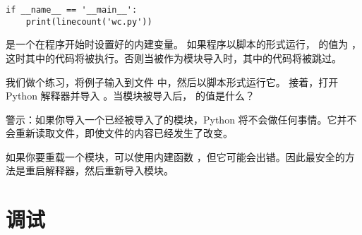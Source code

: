 {{{{{{{\begin{lstlisting}
if __name__ == '__main__':
    print(linecount('wc.py'))
\end{lstlisting}

%

 是一个在程序开始时设置好的内建变量。
如果程序以脚本的形式运行， 的值为  ，这时其中的代码将被执行。否则当被作为模块导入时，其中的代码将被跳过。


我们做个练习，将例子输入到文件  中，然后以脚本形式运行它。
接着，打开 Python 解释器并导入  。当模块被导入后，  的值是什么？


警示：如果你导入一个已经被导入了的模块，Python 将不会做任何事情。它并不会重新读取文件，即使文件的内容已经发生了改变。
  


如果你要重载一个模块，可以使用内建函数  ，但它可能会出错。因此最安全的方法是重启解释器，然后重新导入模块。

\section{调试}
  


}}}}}}}
